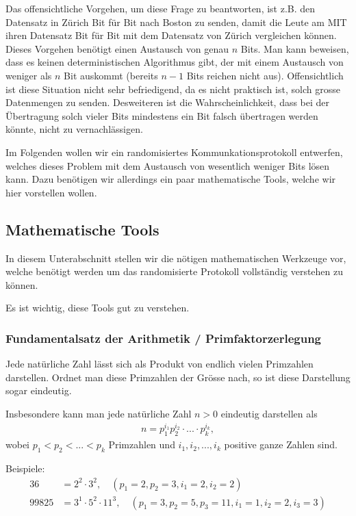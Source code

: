 Das offensichtliche Vorgehen, um diese Frage zu beantworten, ist z.B. den Datensatz in Zürich Bit für Bit nach Boston zu senden, damit die Leute am MIT ihren Datensatz Bit für Bit mit dem Datensatz von Zürich vergleichen können. Dieses Vorgehen benötigt einen Austausch von genau $n$ Bits. Man kann beweisen, dass es keinen deterministischen Algorithmus gibt, der mit einem Austausch von weniger als $n$ Bit auskommt (bereits $n-1$ Bits reichen nicht aus). Offensichtlich ist diese Situation nicht sehr befriedigend, da es nicht praktisch ist, solch grosse Datenmengen zu senden. Desweiteren ist die Wahrscheinlichkeit, dass bei der Übertragung solch vieler Bits mindestens ein Bit falsch übertragen werden könnte, nicht zu vernachlässigen.

Im Folgenden wollen wir ein randomisiertes Kommunkationsprotokoll entwerfen, welches dieses Problem mit dem Austausch von wesentlich weniger Bits lösen kann. Dazu benötigen wir allerdings ein paar mathematische Tools, welche wir hier vorstellen wollen.

\subsection{Mathematische Tools}
In diesem Unterabschnitt stellen wir die nötigen mathematischen Werkzeuge vor, welche benötigt werden um das randomisierte Protokoll vollständig verstehen zu können.

Es ist wichtig, diese Tools gut zu verstehen.

\subsubsection{Fundamentalsatz der Arithmetik / Primfaktorzerlegung}
Jede natürliche Zahl lässt sich als Produkt von endlich vielen Primzahlen darstellen. Ordnet man diese Primzahlen der Grösse nach, so ist diese Darstellung sogar eindeutig.

Insbesondere kann man jede natürliche Zahl $n>0$ eindeutig darstellen als
\begin{align}
    n = p_{1}^{i_1}p_{2}^{i_2}\cdot ...\cdot p_{k}^{i_k},
\end{align}
wobei $p_1<p_2<...<p_k$ Primzahlen und $i_1, i_2, ..., i_k$ positive ganze Zahlen sind.

Beispiele:
\begin{align*}
    36 &= 2^2\cdot 3^2, \quad (p_1 = 2, p_2 = 3, i_1 = 2, i_2 = 2)\\
    99825 & = 3^1\cdot 5^2 \cdot 11^3, \quad (p_1 = 3, p_2 = 5, p_3 = 11, i_1 = 1, i_2 = 2, i_3 = 3)
\end{align*}

